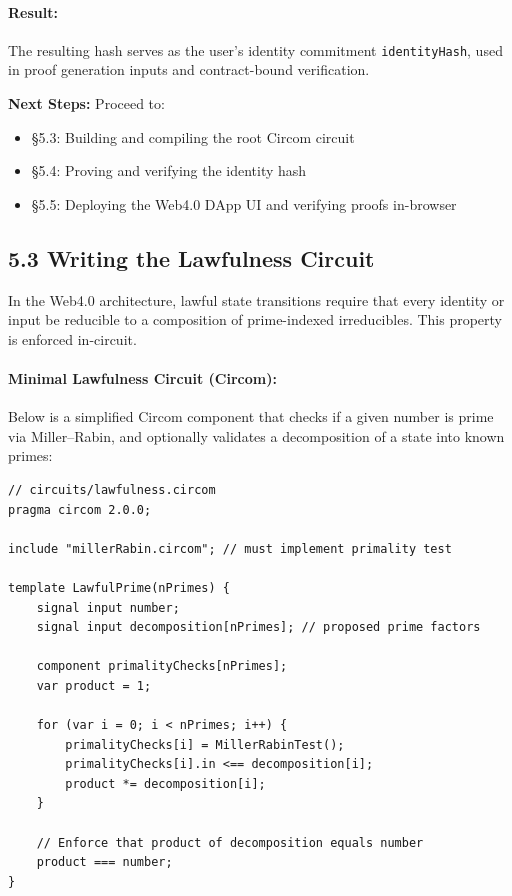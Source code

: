 \documentclass[12]{amsart}
\theoremstyle{plain}
\begin{document}
\paragraph{Result:} The resulting hash serves as the user’s identity commitment \texttt{identityHash}, used in proof generation inputs and contract-bound verification.

\bigskip

\noindent
\textbf{Next Steps:} Proceed to:
\begin{itemize}
  \item \S5.3: Building and compiling the root Circom circuit
  \item \S5.4: Proving and verifying the identity hash
  \item \S5.5: Deploying the Web4.0 DApp UI and verifying proofs in-browser
\end{itemize}

\subsection{5.3 Writing the Lawfulness Circuit}
\label{subsec:lawfulness_circuit}

In the Web4.0 architecture, lawful state transitions require that every identity or input be reducible to a composition of prime-indexed irreducibles. This property is enforced in-circuit.

\paragraph{Minimal Lawfulness Circuit (Circom):}
Below is a simplified Circom component that checks if a given number is prime via Miller–Rabin, and optionally validates a decomposition of a state into known primes:

\begin{verbatim}
// circuits/lawfulness.circom
pragma circom 2.0.0;

include "millerRabin.circom"; // must implement primality test

template LawfulPrime(nPrimes) {
    signal input number;
    signal input decomposition[nPrimes]; // proposed prime factors

    component primalityChecks[nPrimes];
    var product = 1;

    for (var i = 0; i < nPrimes; i++) {
        primalityChecks[i] = MillerRabinTest();
        primalityChecks[i].in <== decomposition[i];
        product *= decomposition[i];
    }

    // Enforce that product of decomposition equals number
    product === number;
}
\end{verbatim}
\end{document}
